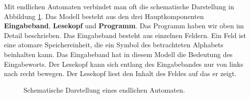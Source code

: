 \noindent
Mit endlichen Automaten verbindet man oft die schematische Darstellung in Abbildung \cref{fig:EA_schema}. Das Modell besteht aus den drei Hauptkomponenten \textbf{Eingabeband}, \textbf{Lesekopf} und \textbf{Programm}. Das Programm haben wir oben im Detail beschrieben. Das Eingabeband besteht aus einzelnen Feldern. Ein Feld ist eine atomare Speichereinheit, die ein Symbol des betrachteten Alphabets beinhalten kann. Das Eingabeband hat in diesem Modell die Bedeutung des Eingabeworts. Der Lesekopf kann sich entlang des Eingabebandes nur von links nach recht bewegen. Der Lesekopf liest den Inhalt des Feldes auf das er zeigt.
\begin{figure}[H]
	\centering
	\caption{Schematische Darstellung eines endlichen Automaten.}
	\label{fig:EA_schema}
\end{figure}
\clearpage


